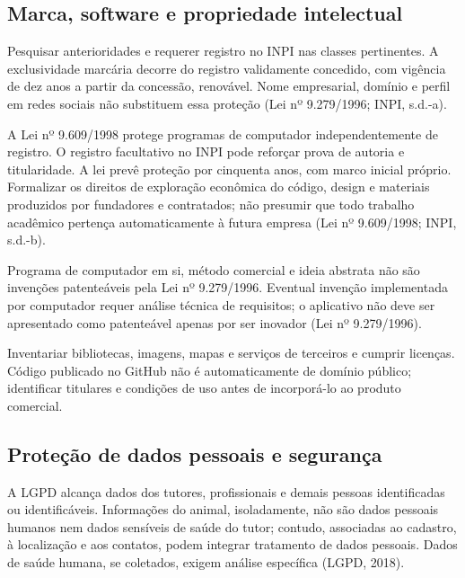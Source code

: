 \subsection{Marca, software e propriedade intelectual}
\begin{description}[style=nextline,leftmargin=0cm]
\item[Marca PetCuida.] Pesquisar anterioridades e requerer registro no INPI nas classes pertinentes. A exclusividade marcária decorre do registro validamente concedido, com vigência de dez anos a partir da concessão, renovável. Nome empresarial, domínio e perfil em redes sociais não substituem essa proteção (Lei nº 9.279/1996; INPI, s.d.-a).
\item[Software e conteúdo.] A Lei nº 9.609/1998 protege programas de computador independentemente de registro. O registro facultativo no INPI pode reforçar prova de autoria e titularidade. A lei prevê proteção por cinquenta anos, com marco inicial próprio. Formalizar os direitos de exploração econômica do código, design e materiais produzidos por fundadores e contratados; não presumir que todo trabalho acadêmico pertença automaticamente à futura empresa (Lei nº 9.609/1998; INPI, s.d.-b).
\item[Patentes.] Programa de computador em si, método comercial e ideia abstrata não são invenções patenteáveis pela Lei nº 9.279/1996. Eventual invenção implementada por computador requer análise técnica de requisitos; o aplicativo não deve ser apresentado como patenteável apenas por ser inovador (Lei nº 9.279/1996).
\item[Dependências e repositórios.] Inventariar bibliotecas, imagens, mapas e serviços de terceiros e cumprir licenças. Código publicado no GitHub não é automaticamente de domínio público; identificar titulares e condições de uso antes de incorporá-lo ao produto comercial.
\end{description}

\subsection{Proteção de dados pessoais e segurança}
A LGPD alcança dados dos tutores, profissionais e demais pessoas identificadas ou identificáveis. Informações do animal, isoladamente, não são dados pessoais humanos nem dados sensíveis de saúde do tutor; contudo, associadas ao cadastro, à localização e aos contatos, podem integrar tratamento de dados pessoais. Dados de saúde humana, se coletados, exigem análise específica (LGPD, 2018).


